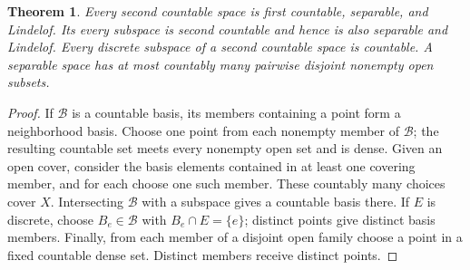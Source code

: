 \documentclass[11pt,oneside,openany]{book}
\newtheorem{theorem}{Theorem}[chapter]
\theoremstyle{definition}
\theoremstyle{remark}
\begin{document}
\begin{theorem}\label{d10:08:second-implications}
Every second countable space is first countable, separable, and Lindelof. Its every subspace is second countable and hence is also separable and Lindelof. Every discrete subspace of a second countable space is countable. A separable space has at most countably many pairwise disjoint nonempty open subsets.
\end{theorem}
\begin{proof}
If $\mathcal B$ is a countable basis, its members containing a point form a neighborhood basis. Choose one point from each nonempty member of $\mathcal B$; the resulting countable set meets every nonempty open set and is dense. Given an open cover, consider the basis elements contained in at least one covering member, and for each choose one such member. These countably many choices cover $X$. Intersecting $\mathcal B$ with a subspace gives a countable basis there. If $E$ is discrete, choose $B_e\in\mathcal B$ with $B_e\cap E=\{e\}$; distinct points give distinct basis members. Finally, from each member of a disjoint open family choose a point in a fixed countable dense set. Distinct members receive distinct points.
\end{proof}
\end{document}

